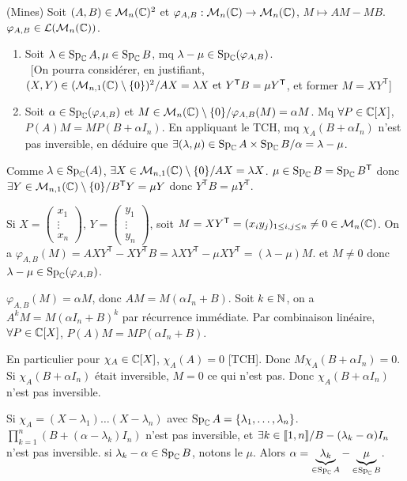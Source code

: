 \begin{statementbox}
(Mines) Soit $(A,B) \in \mathcal M_n(\mathbb C)^2$ et $\varphi_{A,B} : \mathcal M_n(\mathbb C) \to \mathcal M_n(\mathbb C)$, $M \mapsto AM - MB$.
$\varphi_{A,B} \in \mathcal L(\mathcal M_n(\mathbb C))$.
\begin{enumerate}[label=\alph*)]
  \item Soit $\lambda \in \operatorname{Sp}_\mathbb C A, \mu \in \operatorname{Sp}_\mathbb C B$, mq $\lambda - \mu \in \operatorname{Sp}_\mathbb C(\varphi_{A,B})$.\\
  ~[On pourra considérer, en justifiant, $(X, Y) \in (\mathcal M_{n,1}(\mathbb C) \setminus \{0\})^2 / AX = \lambda X \text{ et } Y^{\mathsf T} B = \mu Y^{\mathsf T}$, et former $M = X Y^{\mathsf T}$]
  \item Soit $\alpha \in \operatorname{Sp}_\mathbb C(\varphi_{A,B})$ et $M \in \mathcal M_n(\mathbb C) \setminus \{0\} / \varphi_{A,B}(M) = \alpha M$.
  Mq $\forall P \in \mathbb C[X]$, $P(A)M = M P(B + \alpha I_n)$.
  En appliquant le TCH, mq $\chi_A(B + \alpha I_n)$ n'est pas inversible, en déduire que $\exists (\lambda, \mu) \in \operatorname{Sp}_\mathbb C A \times \operatorname{Sp}_\mathbb C B / \alpha = \lambda - \mu$.
\end{enumerate}
\end{statementbox}

\begin{solution}
Comme $\lambda \in \operatorname{Sp}_\mathbb C(A)$, $\exists X \in \mathcal M_{n,1}(\mathbb C) \setminus \{0\} / AX = \lambda X$.
$\mu \in \operatorname{Sp}_\mathbb C B = \operatorname{Sp}_\mathbb C B^{\mathsf T}$ donc $\exists Y \in \mathcal M_{n,1}(\mathbb C) \setminus \{0\} / B^{\mathsf T} Y = \mu Y$ donc $Y^{\mathsf T} B = \mu Y^{\mathsf T}$.

Si $X = \begin{pmatrix} x_1 \\ \vdots \\ x_n \end{pmatrix}$, $Y = \begin{pmatrix} y_1 \\ \vdots \\ y_n \end{pmatrix}$, soit $M = X Y^{\mathsf T} = (x_i y_j)_{1 \leq i,j \leq n} \neq 0 \in \mathcal M_n(\mathbb C)$.
On a $\varphi_{A,B}(M) = A X Y^{\mathsf T} - X Y^{\mathsf T} B = \lambda X Y^{\mathsf T} - \mu X Y^{\mathsf T} = (\lambda - \mu) M$.
et $M \neq 0$ donc $\lambda - \mu \in \operatorname{Sp}_\mathbb C(\varphi_{A,B})$.

$\varphi_{A,B}(M) = \alpha M$, donc $AM = M(\alpha I_n + B)$.
Soit $k \in \mathbb N$, on a $A^k M = M(\alpha I_n + B)^k$ par récurrence immédiate.
Par combinaison linéaire, $\forall P \in \mathbb C[X]$, $P(A)M = M P(\alpha I_n + B)$.

En particulier pour $\chi_A \in \mathbb C[X]$, $\chi_A(A) = 0$ [TCH].
Donc $M \chi_A(B + \alpha I_n) = 0$.
Si $\chi_A(B + \alpha I_n)$ était inversible, $M = 0$ ce qui n'est pas.
Donc $\chi_A(B + \alpha I_n)$ n'est pas inversible.

Si $\chi_A = (X - \lambda_1) \dots (X - \lambda_n)$ avec $\operatorname{Sp}_\mathbb C A = \{\lambda_1, \dots, \lambda_n\}$.
$\prod_{k=1}^n (B + (\alpha - \lambda_k)I_n)$ n'est pas inversible, et
$\exists k \in \llbracket 1,n\rrbracket / B - (\lambda_k - \alpha)I_n$ n'est pas inversible.
si $\lambda_k - \alpha \in \operatorname{Sp}_\mathbb C B$, notons le $\mu$. Alors $\alpha = \underbrace{\lambda_k}_{\in \operatorname{Sp}_\mathbb C A} - \underbrace{\mu}_{\in \operatorname{Sp}_\mathbb C B}$.
\end{solution}
